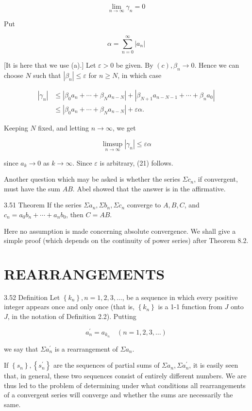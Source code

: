 \documentclass[10pt]{article}
\begin{document}
$$
\lim _{n \rightarrow \infty} \gamma_{n}=0
$$

Put

$$
\alpha=\sum_{n=0}^{\infty}\left|a_{n}\right|
$$

[It is here that we use (a).] Let $\varepsilon>0$ be given. By $(c), \beta_{n} \rightarrow 0$. Hence we can choose $N$ such that $\left|\beta_{n}\right| \leq \varepsilon$ for $n \geq N$, in which case

$$
\begin{aligned}
\left|\gamma_{n}\right| & \leq\left|\beta_{0} a_{n}+\cdots+\beta_{N} a_{n-N}\right|+\left|\beta_{N+1} a_{n-N-1}+\cdots+\beta_{n} a_{0}\right| \\
& \leq\left|\beta_{0} a_{n}+\cdots+\beta_{N} a_{n-N}\right|+\varepsilon \alpha .
\end{aligned}
$$

Keeping $N$ fixed, and letting $n \rightarrow \infty$, we get

$$
\limsup _{n \rightarrow \infty}\left|\gamma_{n}\right| \leq \varepsilon \alpha
$$

since $a_{k} \rightarrow 0$ as $k \rightarrow \infty$. Since $\varepsilon$ is arbitrary, (21) follows.

Another question which may be asked is whether the series $\Sigma c_{n}$, if convergent, must have the sum $A B$. Abel showed that the answer is in the affirmative.

3.51 Theorem If the series $\Sigma a_{n}, \Sigma b_{n}, \Sigma c_{n}$ converge to $A, B, C$, and $c_{n}=a_{0} b_{n}+\cdots+a_{n} b_{0}$, then $C=A B$.

Here no assumption is made concerning absolute convergence. We shall give a simple proof (which depends on the continuity of power series) after Theorem 8.2.

\section{REARRANGEMENTS}
3.52 Definition Let $\left\{k_{n}\right\}, n=1,2,3, \ldots$, be a sequence in which every positive integer appears once and only once (that is, $\left\{k_{n}\right\}$ is a 1-1 function from $J$ onto $J$, in the notation of Definition 2.2). Putting

$$
a_{n}^{\prime}=a_{k_{n}} \quad(n=1,2,3, \ldots)
$$

we say that $\Sigma a_{n}^{\prime}$ is a rearrangement of $\Sigma a_{n}$.

If $\left\{s_{n}\right\},\left\{s_{n}^{\prime}\right\}$ are the sequences of partial sums of $\Sigma a_{n}, \Sigma a_{n}^{\prime}$, it is easily seen that, in general, these two sequences consist of entirely different numbers. We are thus led to the problem of determining under what conditions all rearrangements of a convergent series will converge and whether the sums are necessarily the same.
\end{document}
